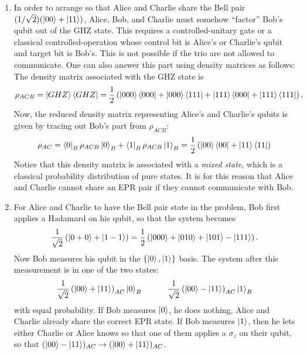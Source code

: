 \documentclass{article}
\theoremstyle{definition}
\newcommand{\f}[2]{\frac{#1}{#2}}
\newcommand{\lp}{\left(}
\newcommand{\rp}{\right)}
\begin{document}
\begin{enumerate}[label=(\alph*)]
	
	\item In order to arrange so that Alice and Charlie share the Bell pair $(1/\sqrt{2})(\ket{00} + \ket{11})$, Alice, Bob, and Charlie must somehow ``factor'' Bob's qubit out of the GHZ state. This requires a controlled-unitary gate or a classical controlled-operation whose control bit is Alice's or Charlie's qubit and target bit is Bob's. This is not possible if the trio are not allowed to communicate. One can also answer this part using density matrices as follows:\\
	
	The density matrix associated with the GHZ state is 
	\begin{align*}
		\rho_{ACB} = \ket{GHZ} \bra{GHZ} = \f{1}{2}\lp \ket{000}\bra{000} + \ket{000}\bra{111} + \ket{111}\bra{000} + \ket{111}\bra{111} \rp.
	\end{align*}
	Now, the reduced density matrix representing Alice's and Charlie's qubits is given by tracing out Bob's part from $\rho_{ACB}$:
	\begin{align*}
		\rho_{AC} = \bra{0}_B \rho_{ACB} \ket{0}_B + \bra{1}_B \rho_{ACB} \ket{1}_B = \f{1}{2}\lp \ket{00}\bra{00} + \ket{11} \bra{11} \rp 
	\end{align*}
	Notice that this density matrix is associated with a \textit{mixed state}, which is a classical probability distribution of pure states. It is for this reason that Alice and Charlie cannot share an EPR pair if they cannot communicate with Bob. 
	
	\item For Alice and Charlie to have the Bell pair state in the problem, Bob first applies a Hadamard on his qubit, so that the system becomes
	\begin{align*}
		\f{1}{\sqrt{2}}\lp \ket{0+0} + \ket{1-1} \rp = \f{1}{2}\lp \ket{000} + \ket{010} + \ket{101} - \ket{111}  \rp.
	\end{align*}
	Now Bob measures his qubit in the $\{ \ket{0}, \ket{1}  \}$ basis. The system after this measurement is in one of the two states:
	\begin{align*}
		\f{1}{\sqrt{2}}\lp \ket{00} + \ket{11} \rp_{AC}\ket{0}_B \quad\quad\quad \f{1}{\sqrt{2}}\lp \ket{00} - \ket{11} \rp_{AC} \ket{1}_B
	\end{align*}
	with equal probability. If Bob measures $\ket{0}$, he does nothing, Alice and Charlie already share the correct EPR state. If Bob measures $\ket{1}$, then he lets either Charlie or Alice knows so that one of them applies a $\sigma_z$ on their qubit, so that $(\ket{00} - \ket{11})_{AC} \to (\ket{00} + \ket{11})_{AC}$. 
\end{enumerate}
\end{document}
